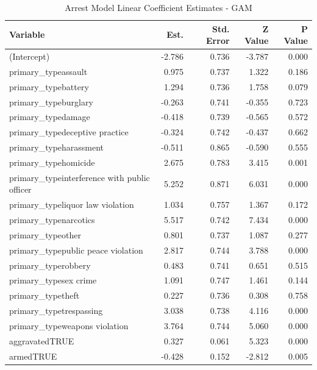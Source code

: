 \documentclass{ucetd}
\begin{document}
\begin{table}
\caption{\label{tab:arrest-gam}Arrest Model Linear Coefficient Estimates - GAM}
\centering
\begin{tabular}[t]{l|r|r|r|r}
\hline
Variable & Est. & Std. Error & Z Value & P Value\\
\hline
(Intercept) & -2.786 & 0.736 & -3.787 & 0.000\\
\hline
primary\_typeassault & 0.975 & 0.737 & 1.322 & 0.186\\
\hline
primary\_typebattery & 1.294 & 0.736 & 1.758 & 0.079\\
\hline
primary\_typeburglary & -0.263 & 0.741 & -0.355 & 0.723\\
\hline
primary\_typedamage & -0.418 & 0.739 & -0.565 & 0.572\\
\hline
primary\_typedeceptive practice & -0.324 & 0.742 & -0.437 & 0.662\\
\hline
primary\_typeharassment & -0.511 & 0.865 & -0.590 & 0.555\\
\hline
primary\_typehomicide & 2.675 & 0.783 & 3.415 & 0.001\\
\hline
primary\_typeinterference with public officer & 5.252 & 0.871 & 6.031 & 0.000\\
\hline
primary\_typeliquor law violation & 1.034 & 0.757 & 1.367 & 0.172\\
\hline
primary\_typenarcotics & 5.517 & 0.742 & 7.434 & 0.000\\
\hline
primary\_typeother & 0.801 & 0.737 & 1.087 & 0.277\\
\hline
primary\_typepublic peace violation & 2.817 & 0.744 & 3.788 & 0.000\\
\hline
primary\_typerobbery & 0.483 & 0.741 & 0.651 & 0.515\\
\hline
primary\_typesex crime & 1.091 & 0.747 & 1.461 & 0.144\\
\hline
primary\_typetheft & 0.227 & 0.736 & 0.308 & 0.758\\
\hline
primary\_typetrespassing & 3.038 & 0.738 & 4.116 & 0.000\\
\hline
primary\_typeweapons violation & 3.764 & 0.744 & 5.060 & 0.000\\
\hline
aggravatedTRUE & 0.327 & 0.061 & 5.323 & 0.000\\
\hline
armedTRUE & -0.428 & 0.152 & -2.812 & 0.005\\
\hline
\end{tabular}
\end{table}
\end{document}
